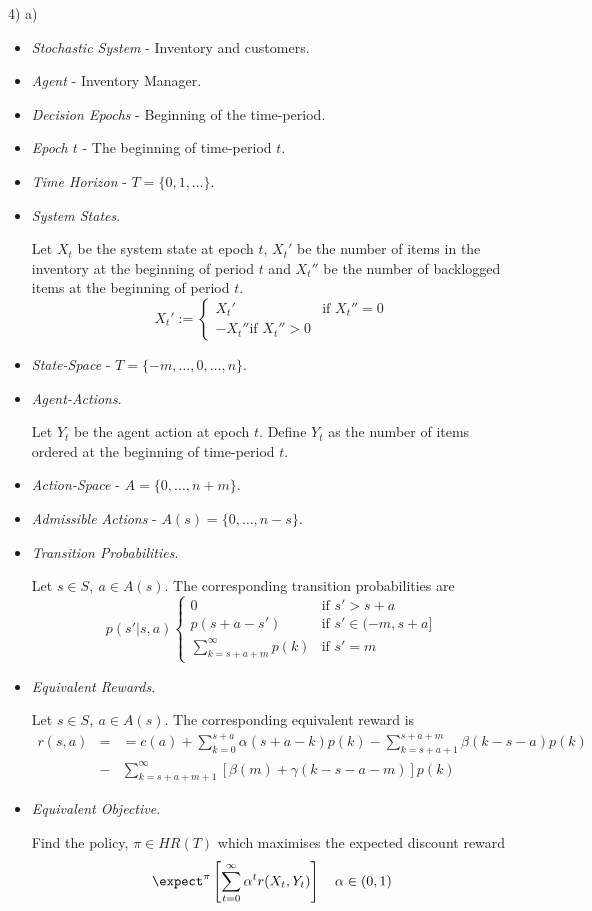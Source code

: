 \documentclass[11pt,a4paper]{article}
\begin{document}
\begin{answer}{4) a)}
  \begin{itemize}
    \item \textit{Stochastic System} - Inventory and customers.
    \item \textit{Agent} - Inventory Manager.
    \item \textit{Decision Epochs} - Beginning of the time-period.
    \item \textit{Epoch $t$} - The beginning of time-period $t$.
    \item \textit{Time Horizon} - $T=\{0,1,\dots\}$.
    \item \textit{System States}.
    \par Let $X_t$ be the system state at epoch $t$, $X_t'$ be the number of items in the inventory at the beginning of period $t$ and $X_t''$ be the number of backlogged items at the beginning of period $t$.
    \[ X_t':=\begin{cases}X_t'&\text{if }X_t''=0\\-X_t''\text{if }X_t''>0\end{cases} \]
    \item \textit{State-Space} - $T=\{-m,\dots,0,\dots,n\}$.
    \item \textit{Agent-Actions}.
    \par Let $Y_t$ be the agent action at epoch $t$. Define $Y_t$ as the number of items ordered at the beginning of time-period $t$.
    \item \textit{Action-Space} - $A=\{0,\dots,n+m\}$.
    \item \textit{Admissible Actions} - $A(s)=\{0,\dots,n-s\}$.
    \item \textit{Transition Probabilities}.
    \par Let $s\in S,\ a\in A(s)$. The corresponding transition probabilities are
    \[ p(s'|s,a)\begin{cases}
      0&\text{if }s'>s+a\\
      p(s+a-s')&\text{if }s'\in(-m,s+a]\\
      \sum_{k=s+a+m}^\infty p(k)&\text{if }s'=m
    \end{cases} \]
    \item \textit{Equivalent Rewards}.
    \par Let $s\in S,\ a\in A(s)$. The corresponding equivalent reward is
    \[\begin{array}{rcl}
      r(s,a)&=&=c(a)+\sum_{k=0}^{s+a}\alpha(s+a-k)p(k)-\sum_{k=s+a+1}^{s+a+m}\beta(k-s-a)p(k)\\
      &-&\sum_{k=s+a+m+1}^\infty\left[\beta(m)+\gamma(k-s-a-m)\right]p(k)
      \end{array}\]
    \item \textit{Equivalent Objective}.
    \par Find the policy, $\pi\in HR(T)$ which maximises the expected discount reward
    \[ \expect^\pi\left[\sum_{t=0}^\infty\alpha^tr(X_t,Y_t)\right]\quad\alpha\in(0,1) \]
  \end{itemize}
\end{answer}
\end{document}
